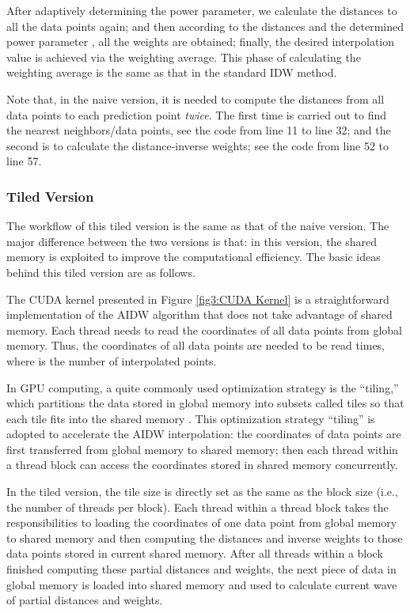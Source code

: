 \documentclass[fleqn,11pt]{wlscirep}
\begin{document}
After adaptively determining the power parameter, we calculate the 
distances to all the data points again; and then according to the distances 
and the determined power parameter , all the  weights are obtained; 
finally, the desired interpolation value is achieved via the weighting 
average. This phase of calculating the weighting average is the same as that 
in the standard IDW method.

Note that, in the naive version, it is needed to compute the distances from 
all data points to each prediction point \textit{twice}. The first time is carried out to 
find the  nearest neighbors/data points, see the code from line 11 to line 
32; and the second is to calculate the distance-inverse weights; see the 
code from line 52 to line 57. 

\subsubsection{Tiled Version}

The workflow of this tiled version is the same as that of the naive version. 
The major difference between the two versions is that: in this version, the 
shared memory is exploited to improve the computational efficiency. The 
basic ideas behind this tiled version are as follows.

The CUDA kernel presented in Figure \ref{fig3:CUDA Kernel} is a straightforward implementation of 
the AIDW algorithm that does not take advantage of shared memory. Each 
thread needs to read the coordinates of all data points from global memory. 
Thus, the coordinates of all data points are needed to be read  times, where 
 is the number of interpolated points.

In GPU computing, a quite commonly used optimization strategy is the 
``tiling,'' which partitions the data stored in global memory into subsets 
called tiles so that each tile fits into the shared memory \cite{14}. This 
optimization strategy ``tiling'' is adopted to accelerate the AIDW 
interpolation: the coordinates of data points are first transferred from 
global memory to shared memory; then each thread within a thread block can 
access the coordinates stored in shared memory concurrently. 

In the tiled version, the tile size is directly set as the same as the block 
size (i.e., the number of threads per block). Each thread within a thread 
block takes the responsibilities to loading the coordinates of one data 
point from global memory to shared memory and then computing the distances 
and inverse weights to those data points stored in current shared memory. 
After all threads within a block finished computing these partial distances 
and weights, the next piece of data in global memory is loaded into shared 
memory and used to calculate current wave of partial distances and weights.
\end{document}
